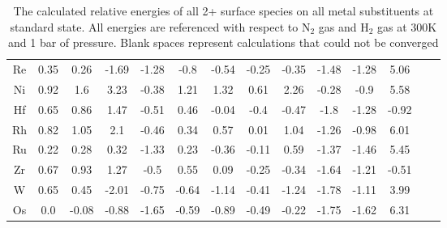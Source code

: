 \documentclass[journal=jacsat,manuscript=article]{achemso}
\begin{document}
\begin{table}
\begin{center}
\begin{tabular}{| c | c | c | c | c | c | c | c | c | c | c | c | c | c |}
Re & 0.35 & 0.26 & -1.69 & -1.28 & -0.8 & -0.54 & -0.25 & -0.35 & -1.48 & -1.28 & 5.06 \\
Ni & 0.92 & 1.6 & 3.23 & -0.38 & 1.21 & 1.32 & 0.61 & 2.26 & -0.28 & -0.9 & 5.58 \\
Hf & 0.65 & 0.86 & 1.47 & -0.51 & 0.46 & -0.04 & -0.4 & -0.47 & -1.8 & -1.28 & -0.92 \\
Rh & 0.82 & 1.05 & 2.1 & -0.46 & 0.34 & 0.57 & 0.01 & 1.04 & -1.26 & -0.98 & 6.01 \\
Ru & 0.22 & 0.28 & 0.32 & -1.33 & 0.23 & -0.36 & -0.11 & 0.59 & -1.37 & -1.46 & 5.45 \\
Zr & 0.67 & 0.93 & 1.27 & -0.5 & 0.55 & 0.09 & -0.25 & -0.34 & -1.64 & -1.21 & -0.51 \\
W & 0.65 & 0.45 & -2.01 & -0.75 & -0.64 & -1.14 & -0.41 & -1.24 & -1.78 & -1.11 & 3.99 \\
Os & 0.0 & -0.08 & -0.88 & -1.65 & -0.59 & -0.89 & -0.49 & -0.22 & -1.75 & -1.62 & 6.31 \\
\hline
\end{tabular}
\end{center}
\caption{The calculated relative energies of all 2+ surface species on all metal substituents at standard state. All energies are referenced with respect to N$_2$ gas and H$_2$ gas at 300K and 1 bar of pressure. Blank spaces represent calculations that could not be converged}
\label{table:energies}
\end{table}
\end{document}
